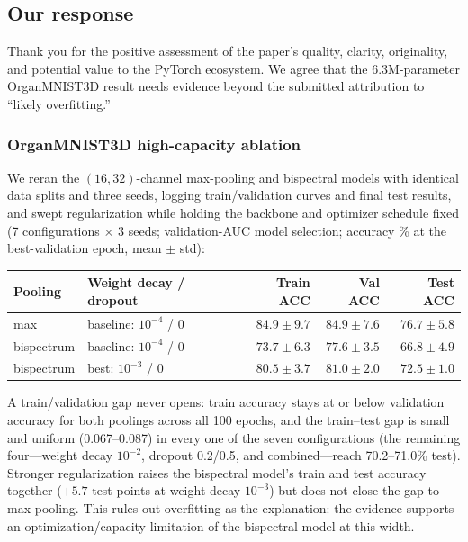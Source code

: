 \documentclass[10pt]{article}
\begin{document}
\subsection{Our response}

Thank you for the positive assessment of the paper's quality, clarity,
originality, and potential value to the PyTorch ecosystem. We agree that the
6.3M-parameter OrganMNIST3D result needs evidence beyond the submitted
attribution to ``likely overfitting.''

\subsubsection*{OrganMNIST3D high-capacity ablation}

We reran the $(16,32)$-channel max-pooling and bispectral models with
identical data splits and three seeds, logging train/validation curves and
final test results, and swept regularization while holding the backbone and
optimizer schedule fixed (7 configurations $\times$ 3 seeds; validation-AUC
model selection; accuracy \% at the best-validation epoch, mean $\pm$ std):

\begin{center}
\begin{tabular}{llrrr}
\toprule
Pooling & Weight decay / dropout & Train ACC & Val ACC & Test ACC \\
\midrule
max        & baseline: $10^{-4}$ / 0 & $84.9 \pm 9.7$ & $84.9 \pm 7.6$ & $76.7 \pm 5.8$ \\
bispectrum & baseline: $10^{-4}$ / 0 & $73.7 \pm 6.3$ & $77.6 \pm 3.5$ & $66.8 \pm 4.9$ \\
bispectrum & best: $10^{-3}$ / 0     & $80.5 \pm 3.7$ & $81.0 \pm 2.0$ & $72.5 \pm 1.0$ \\
\bottomrule
\end{tabular}
\end{center}

A train/validation gap never opens: train accuracy stays at or below
validation accuracy for both poolings across all 100 epochs, and the
train--test gap is small and uniform (0.067--0.087) in every one of the seven
configurations (the remaining four---weight decay $10^{-2}$, dropout 0.2/0.5,
and combined---reach 70.2--71.0\% test). Stronger regularization raises the
bispectral model's train and test accuracy together ($+5.7$ test points at
weight decay $10^{-3}$) but does not close the gap to max pooling. This rules
out overfitting as the explanation: the evidence supports an
optimization/capacity limitation of the bispectral model at this width.
\end{document}

